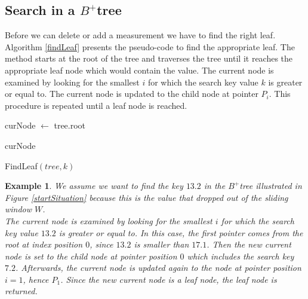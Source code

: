 \documentclass[abstracton,12pt,oneside]{scrreprt}
\newtheorem{example}{Example}
\begin{document}
\subsection{Search in a $B^+$tree}
Before we can delete or add a measurement we have to find the right leaf. 
Algorithm \ref{findLeaf} presents the pseudo-code to find the appropriate leaf. The method starts at the root of the tree and traverses the tree until it reaches the appropriate leaf node which would contain the value. The current node is examined by looking for the smallest $i$ for which the search key value $k$ is greater or equal to. The current node is updated to the child node at pointer $P_i$. This procedure is repeated until a leaf node is reached. 
\BlankLine


\begin{algorithm}[H]
	\IncMargin{1em}
	\SetAlgoLined
	\DontPrintSemicolon

		curNode $\leftarrow$ tree.root\; 
		
	
	\Return curNode\;


	\caption{FindLeaf$(tree, k)$}	\label{findLeaf}
\end{algorithm}

\begin{example}
	We assume we want to find the key $13.2$ in the $B^+$tree illustrated in Figure \ref{startSituation} because this is the value that dropped out of the sliding window $W$. \\
	The current node is examined by looking for the smallest $i$ for which the search key value $13.2$ is greater or equal to. In this case, the first pointer comes from the root at index position $0$, since $13.2$ is smaller than $17.1$. Then the new current node is set to the child node at pointer position $0$ which includes the search key $7.2$. Afterwards, the current node is updated again to the node at pointer position $i=1$, hence $P_1$. Since the new current node is a leaf node, the leaf node is returned. 
\end{example} 
\end{document}
